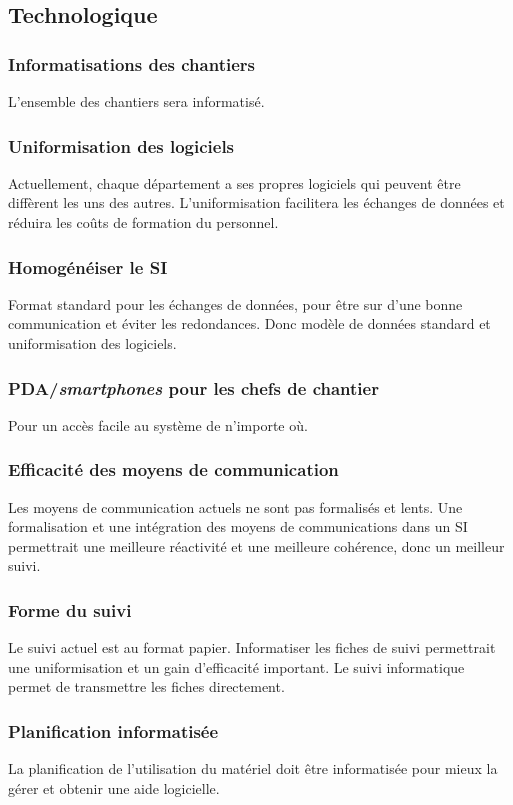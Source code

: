 \subsection{Technologique}

\subsubsection{Informatisations des chantiers}

L’ensemble des chantiers sera informatisé.

\subsubsection{Uniformisation des logiciels}

Actuellement, chaque département a ses propres logiciels qui peuvent être
diffèrent les uns des autres. L’uniformisation facilitera les échanges de
données et réduira les coûts de formation du personnel.

\subsubsection{Homogénéiser le SI}

Format standard pour les échanges de données, pour être sur
d’une bonne communication
et éviter les redondances. Donc modèle de données standard
et uniformisation des logiciels.

\subsubsection{PDA/{\sl smartphones} pour les chefs de chantier}

Pour un accès facile au système de n’importe où.

\subsubsection{Efficacité des moyens de communication}

Les moyens de communication actuels ne sont pas formalisés et lents. 
Une formalisation et une intégration des moyens de communications dans un
SI permettrait une meilleure réactivité et une meilleure cohérence, donc
un meilleur suivi.

\subsubsection{Forme du suivi}

Le suivi actuel est au format papier. Informatiser les fiches de suivi
permettrait une uniformisation et un gain d’efficacité important. Le suivi
informatique permet de transmettre les fiches directement.

\subsubsection{Planification informatisée}
La planification de l’utilisation du matériel doit être informatisée pour
mieux la gérer et obtenir une aide logicielle.
